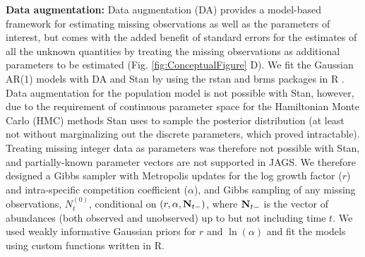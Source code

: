 \documentclass{article}
\begin{document}
\noindent \textbf{Data augmentation: }Data augmentation (DA) provides a model-based framework for estimating missing observations as well as the parameters of interest, but comes with the added benefit of standard errors for the estimates of all the unknown quantities by treating the missing observations as additional parameters to be estimated (Fig. \ref{fig:ConceptualFigure} D). We fit the Gaussian AR(1) models with DA and Stan \citep{carpenter_stan_2017} by using the rstan \citep{rstan_package} and brms \citep{burkner2017brms} packages in R \citep{r_2021}. Data augmentation for the population model is not possible with Stan, however, due to the requirement of continuous parameter space for the Hamiltonian Monte Carlo (HMC) methods Stan uses to sample the posterior distribution (at least not without marginalizing out the discrete parameters, which proved intractable). Treating missing integer data as parameters was therefore not possible with Stan, and partially-known parameter vectors are not supported in JAGS. We therefore designed a Gibbs sampler with Metropolis updates for the log growth factor ($r$) and intra-specific competition coefficient ($\alpha$), and Gibbs sampling of any missing observations, $N_{t}^{(0)}$, conditional on $(r, \alpha, {\bf N}_{t-})$, where ${\bf N}_{t-}$ is the vector of abundances (both observed and unobserved) up to but not including time $t$. We used weakly informative Gaussian priors for $r$ and $\ln(\alpha)$ and fit the models using custom functions written in R. %



\end{document}
